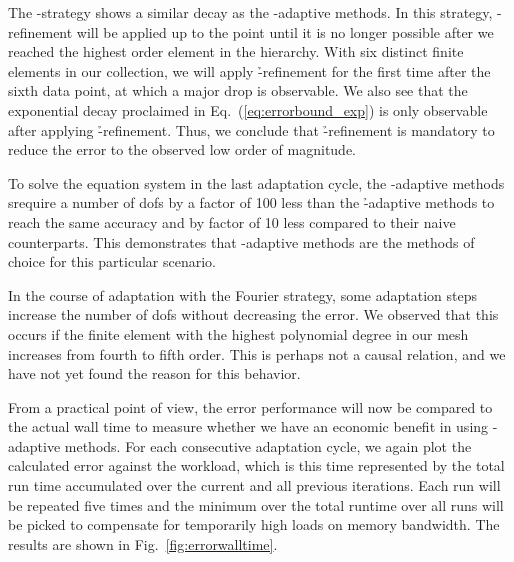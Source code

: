 The \p-strategy shows a similar decay as the \hp-adaptive methods.%
In this strategy, \p-refinement will be applied up to the point until it is no longer possible after we reached the highest order element in the hierarchy. With six distinct finite elements in our collection, we will apply \h-refinement for the first time after the sixth data point, at which a major drop is observable. We also see that the exponential decay proclaimed in Eq.~(\ref{eq:errorbound_exp}) is only observable after applying \h-refinement. Thus, we conclude that \h-refinement is mandatory to reduce the error to the observed low order of magnitude.

To solve the equation system in the last adaptation cycle, the \hp-adaptive methods %
srequire a number of \glspl{dof} by a factor of 100 less than the \h-adaptive methods to reach the same accuracy
and by factor of 10 less compared to their naive counterparts. This demonstrates that \hp-adaptive methods are the methods of choice for this particular scenario.


In the course of adaptation with the Fourier strategy, some adaptation steps increase the number of \glspl{dof} without decreasing the error.
We observed that this occurs if the finite element with the highest polynomial degree in our mesh increases from fourth to fifth order. This is perhaps not a causal relation, and we have not yet found the reason for this behavior.





From a practical point of view, the error performance will now be compared to the actual wall time to measure whether we have an economic benefit in using \hp-adaptive methods. For each consecutive adaptation cycle, we again plot the calculated error against the workload, which is this time represented by the total run time accumulated over the current and all previous iterations. Each run will be repeated five times and the minimum over the total runtime over all runs will be picked to compensate for temporarily high loads on memory bandwidth. The results are shown in Fig.~\ref{fig:errorwalltime}.

